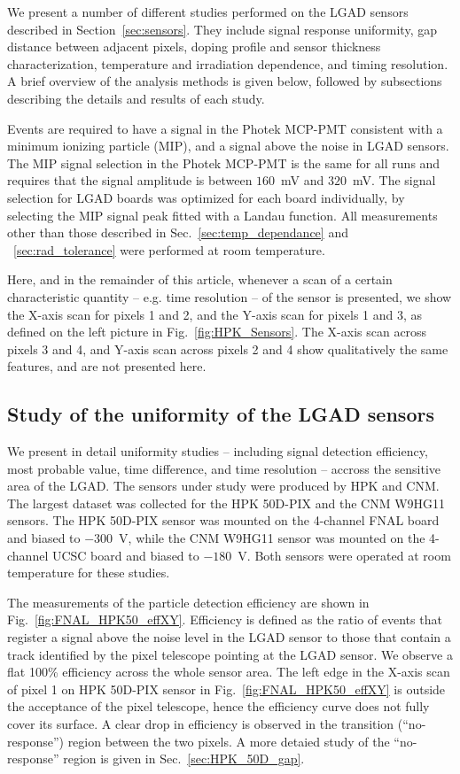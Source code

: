 \documentclass[preprint,1p]{elsarticle}
\begin{document}
We present a number of different studies performed on the LGAD sensors 
described in Section~\ref{sec:sensors}. They include signal response 
uniformity, gap distance between adjacent pixels, 
doping profile and sensor thickness characterization,
temperature and irradiation dependence, and timing resolution. A brief overview of the
analysis methods is given below, followed by subsections describing
the details and results of each study.

Events are required to have a signal in the Photek MCP-PMT consistent with a 
minimum ionizing particle (MIP), and a signal above the noise in LGAD sensors. 
The MIP signal selection in the Photek MCP-PMT is the same for all runs
and requires that the signal amplitude is between $160$~mV and $320$~mV.
The signal selection for LGAD boards was
optimized for each board individually, by selecting the MIP signal peak fitted
with a Landau function. All measurements other than those described in Sec.~\ref{sec:temp_dependance}
and ~\ref{sec:rad_tolerance} were performed at room temperature. 

Here, and in the remainder of this article, whenever a scan of a certain
characteristic quantity -- e.g. time resolution --  of the sensor is presented, we show the
X-axis scan for pixels 1 and 2, and the Y-axis scan for pixels 1 and 3, as
defined on the left picture in Fig.~\ref{fig:HPK_Sensors}. The X-axis scan
across pixels 3 and 4, and Y-axis scan across pixels 2 and 4 show
qualitatively the same features, and are not presented here. 


\subsection{Study of the uniformity of the LGAD sensors}
\label{sec:HPK_CNM_uniformity}

We present in detail uniformity studies -- including signal detection
efficiency, most probable value, time difference, and time resolution  -- accross the sensitive
area of the LGAD. The sensors under study were produced
by HPK and CNM. The largest dataset was collected for the 
HPK 50D-PIX and the CNM W9HG11 sensors. The 
HPK 50D-PIX sensor was mounted on the 4-channel FNAL board and biased to $-300$~V, while the 
CNM W9HG11 sensor was mounted on the 4-channel UCSC board and biased to $-180$~V.
Both sensors were operated at room temperature for these studies. 

The measurements of the particle detection efficiency are shown in
Fig.~\ref{fig:FNAL_HPK50_effXY}. Efficiency is defined as the ratio of events
that register a signal above the noise level in the LGAD sensor to those that
contain a track identified by the pixel telescope pointing at the LGAD sensor.
We observe a flat 100\% efficiency across the whole sensor area. The left edge
in the X-axis scan of pixel 1 on HPK 50D-PIX sensor in
Fig.~\ref{fig:FNAL_HPK50_effXY} is outside the acceptance of the pixel
telescope, hence the efficiency curve does not fully cover its surface. A clear
drop in efficiency is observed in the transition (``no-response'') region between the two pixels.
A more detaied study of the ``no-response'' region is given in Sec.~\ref{sec:HPK_50D_gap}.
\end{document}
